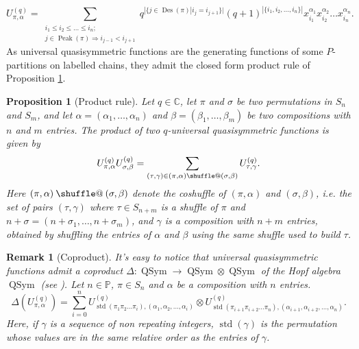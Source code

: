 \documentclass[submission]{FPSAC2023}
\makeatletter
\newtheorem{proposition}{Proposition}
\newtheorem{remark}{Remark}
\newcommand{\al}{\alpha}
\newcommand{\be}{\beta}
\newcommand{\CC}{\mathbb{C}} %
\newcommand{\PP}{\mathbb{P}} %
\newcommand{\std}{\operatorname{std}}
\newcommand{\Des}{\operatorname{Des}}
\newcommand{\Peak}{\operatorname{Peak}}
\providecommand*{\shuffle}{%
  \mathbin{\mathpalette\shuffle@{}}%
}
\newcommand*{\shuffle@}[2]{%
  \sbox0{$#1\vcenter{}$}%
  \kern .15\ht0 %
  \rlap{\vrule height .25\ht0 depth 0pt width 2.5\ht0}%
  \raise.1\ht0\hbox to 2.5\ht0{%
    \vrule height 1.75\ht0 depth -.1\ht0 width .17\ht0 %
    \hfill
    \vrule height 1.75\ht0 depth -.1\ht0 width .17\ht0 %
    \hfill
    \vrule height 1.75\ht0 depth -.1\ht0 width .17\ht0 %
  }%
  \kern .15\ht0 %
}
\makeatother
\begin{document}
\begin{equation}
U_{\pi,\alpha}^{(q)}=\sum_{\substack{i_{1}\leq i_{2}\leq
\dots\leq i_{n};\\j\in\Peak(\pi)\Rightarrow 
i_{j-1}<i_{j+1}  }}q^{|\{j\in\Des(\pi
)|i_{j}=i_{j+1}\}|}(q+1)^{|\{i_{1},i_{2},\dots, i_{n}\}|}x_{i_{1}}^{\alpha_{1}%
}x_{i_{2}}^{\alpha_{2}}\dots x_{i_{n}}^{\alpha_{n}}.
\label{eq : Uqq}
\end{equation}
As universal quasisymmetric functions are the generating functions of some $P$-partitions on labelled chains, they admit the closed form product rule of Proposition \ref{prop : UUU}. 
\begin{proposition}[Product rule]
\label{prop : UUU}
Let $q \in \CC$, let $\pi$ and $\sigma$ be two permutations in $S_n$ and $S_m$, and let $\alpha = (\al_1,\dots,\al_n)$ and $\beta = (\be_1,\dots,\be_m)$ be two compositions with $n$ and $m$ entries.
The product of two $q$-universal quasisymmetric functions is given by
\begin{equation}
\label{eq : UU}
U^{(q)}_{\pi,\alpha}U^{(q)}_{\sigma,\beta}=\sum_{(\tau,\gamma)\in(\pi,\alpha)\shuffle(\sigma,\beta)}U^{(q)}_{\tau,\gamma} .
\end{equation}
Here $(\pi,\alpha) \shuffle (\sigma,\beta)$ denote the \emph{coshuffle} of $(\pi,\alpha)$ and $(\sigma,\beta)$, i.e. the set of pairs $(\tau,\gamma)$ where $\tau \in S_{n+m}$ is a shuffle of $\pi$ and $n+\sigma = (n+\sigma_1, \dots, n+\sigma_m)$, and $\gamma$ is a composition with $n+m$ entries, obtained by shuffling the entries of $\alpha$ and $\beta$ using the same shuffle used to build $\tau$. 
\end{proposition}
%
\begin{remark}[Coproduct]
It's easy to notice that universal quasisymmetric functions admit a coproduct $\Delta:\operatorname*{QSym}\rightarrow
\operatorname*{QSym}\otimes\operatorname*{QSym}$ of the Hopf algebra
$\operatorname*{QSym}$ (see \cite[\S 5.1]{GriRei20}). Let $n \in \PP$, $\pi \in S_n$ and $\alpha$ be a composition with $n$ entries.
\begin{equation*}
\Delta(U^{(q)}_{\pi, \alpha})
= \sum_{i=0}^n U^{(q)}_{\std(\pi_1\pi_2\dots \pi_i), (\al_1,\al_2,\dots,\al_i)} \otimes
U^{(q)}_{\std(\pi_{i+1}\pi_{i+2}\dots \pi_n), (\al_{i+1},\al_{i+2},\dots,\al_n)}.
\end{equation*}
Here, if $\gamma$ is a sequence of non repeating integers, $\std(\gamma)$ is the permutation whose values are in the same relative order as the entries of $\gamma$.
\end{remark}
\end{document}
